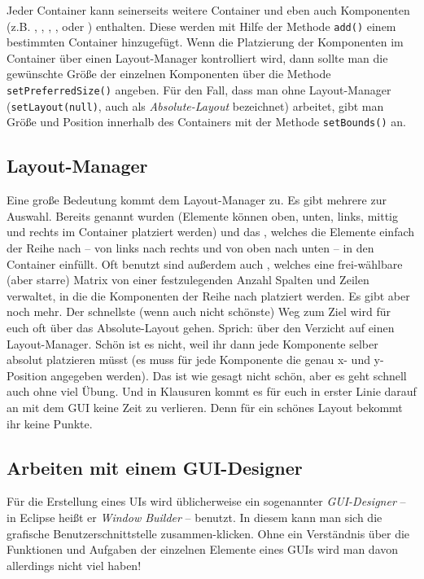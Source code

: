 Jeder Container kann seinerseits weitere Container und eben auch Komponenten
(z.B. , , ,
,  oder ) enthalten.
Diese werden mit Hilfe der Methode \lstinline|add()| einem bestimmten Container
hinzugefügt. Wenn die Platzierung der Komponenten im Container über einen
Layout-Manager kontrolliert wird, dann sollte man die gewünschte Größe der
einzelnen Komponenten über die Methode \lstinline|setPreferredSize()| angeben.
Für den Fall, dass man ohne Layout-Manager (\lstinline|setLayout(null)|, auch
als \emph{Absolute-Layout} bezeichnet) arbeitet, gibt man Größe und Position
innerhalb des Containers mit der Methode \lstinline|setBounds()| an.

\subsection{Layout-Manager}

Eine große Bedeutung kommt dem Layout-Manager zu. Es gibt mehrere zur Auswahl.
Bereits genannt wurden  (Elemente können oben, unten,
links, mittig und rechts im Container platziert werden) und das
, welches die Elemente einfach der Reihe nach – von links
nach rechts und von oben nach unten – in den Container einfüllt. Oft benutzt
sind außerdem auch , welches eine frei-wählbare (aber
starre) Matrix von einer festzulegenden Anzahl Spalten und Zeilen verwaltet, in
die die Komponenten der Reihe nach platziert werden. Es gibt aber noch mehr.
Der schnellste (wenn auch nicht schönste) Weg zum Ziel wird für euch oft über
das Absolute-Layout gehen. Sprich: über den Verzicht auf einen Layout-Manager.
Schön ist es nicht, weil ihr dann jede Komponente selber absolut platzieren
müsst (es muss für jede Komponente die genau x- und y-Position angegeben
werden). Das ist wie gesagt nicht schön, aber es geht schnell auch ohne
viel Übung. Und in Klausuren kommt es für euch in erster Linie darauf an mit
dem GUI keine Zeit zu verlieren. Denn für ein schönes Layout bekommt ihr keine
Punkte.

\subsection{Arbeiten mit einem GUI-Designer}

Für die Erstellung eines UIs wird üblicherweise ein sogenannter
\emph{GUI-Designer} --  in Eclipse heißt er \emph{Window Builder} -- benutzt.
In diesem kann man sich die grafische Benutzerschnittstelle \glqq
zusammen-klicken\grqq . Ohne ein Verständnis über die Funktionen und Aufgaben
der einzelnen Elemente eines GUIs wird man davon allerdings nicht viel haben!

